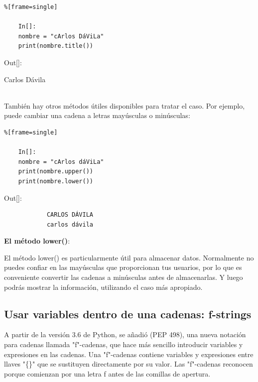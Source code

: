 \begin{lstlisting}%[frame=single]
	
	In[]:	
	nombre = "cArlos DáViLa"
	print(nombre.title())
\end{lstlisting}


{\ttfamily\scriptsize\scriptsize 
	\hspace{-0.65cm}Out[]:\vspace{-0.15cm}	
	
	{\color{blue} 
		\hspace{-0.65cm}Carlos Dávila}} \\	

También hay otros métodos útiles disponibles para tratar el caso. Por ejemplo, puede cambiar una cadena a letras mayúsculas o minúsculas:

\begin{lstlisting}%[frame=single]
	
	In[]:	
	nombre = "cArlos dáViLa"
	print(nombre.upper())
	print(nombre.lower())
\end{lstlisting}

{\ttfamily\scriptsize\scriptsize 
	\hspace{-0.65cm}Out[]:\vspace{-0.15cm}	
	{\color{blue} 	
		\begin{verbatim}		
			CARLOS DÁVILA
			carlos dávila
		\end{verbatim}
}}

{\bf El método {\ttfamily lower()}}: 	

El método {\ttfamily lower()}  es particularmente útil para almacenar datos.  Normalmente no puedes confiar en las mayúsculas que proporcionan tus usuarios, por lo que es conveniente convertir las cadenas a minúsculas antes de almacenarlas. Y luego podrás mostrar la información, utilizando el caso  más apropiado.







\subsection{Usar variables dentro de una cadenas: {\ttfamily f-strings}}


A partir de la versión 3.6 de Python, se añadió (PEP 498), una nueva notación para cadenas llamada {\ttfamily {}"{}f{}"{}}-cadenas, que hace más sencillo introducir variables y expresiones en las cadenas. Una {\ttfamily {}"{}f{}"{}}-cadenas contiene variables y expresiones entre llaves "\{\}" que se sustituyen directamente por su valor. Las {\ttfamily {}"{}f{}"{}}-cadenas reconocen porque comienzan por una letra {\ttfamily f} antes de las comillas de apertura.\\





